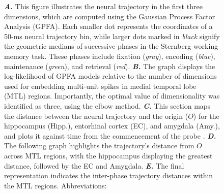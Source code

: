 \documentclass[final,3p,times,twocolumn]{elsarticle}
\begin{document}
\begin{figure}[ht]
{\textbf{\textit{A.}} This figure illustrates the neural trajectory in the first three dimensions, which are computed using the Gaussian Process Factor Analysis (GPFA). Each smaller dot represents the coordinates of a 50-ms neural trajectory bin, while larger dots marked in \textit{black} signify the geometric medians of successive phases in the Sternberg working memory task. These phases include fixation (\textit{gray}), encoding (\textit{blue}), maintenance (\textit{green}), and retrieval (\textit{red})\cite{yu_gaussian-process_2009}. \textbf{\textit{B.}} The graph displays the log-likelihood of GPFA models relative to the number of dimensions used for embedding multi-unit spikes in medial temporal lobe (MTL) regions. Importantly, the optimal value of dimensionality was identified as three, using the elbow method\cite{virtanen_scipy_2020}. \textbf{\textit{C.}} This section maps the distance between the neural trajectory and the origin ($O$) for the hippocampus (Hipp.), entorhinal cortex (EC), and amygdala (Amy.), and plots it against time from the commencement of the probe \cite{boran_dataset_2020}. \textbf{\textit{D.}} The following graph highlights the trajectory's distance from $O$ across MTL regions, with the hippocampus displaying the greatest distance, followed by the EC and Amygdala\cite{fernandez-ruiz_long-duration_2019}. \textbf{\textit{E.}} The final representation indicates the inter-phase trajectory distances within the MTL regions\cite{liu_consensus_2022}.
Abbreviations:
}
        	\label{fig:02}
        \end{figure}
        \clearpage
\end{document}
